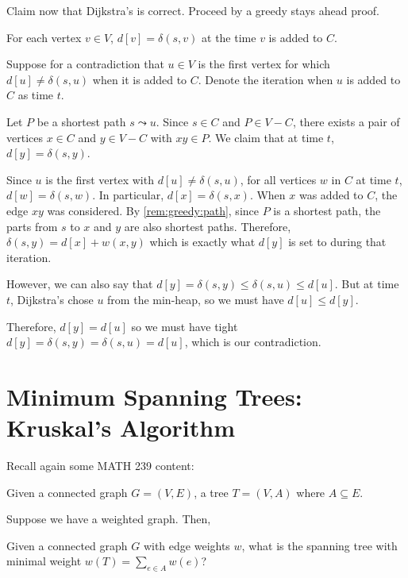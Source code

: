 Claim now that Dijkstra's is correct.
Proceed by a greedy stays ahead proof.

\begin{prop}
  For each vertex $v \in V$, $d[v] = \delta(s,v)$ at the time $v$ is added to $C$.
\end{prop}
\begin{prf}
  Suppose for a contradiction that $u \in V$
  is the first vertex for which $d[u] \neq \delta(s,u)$ when it is added to $C$.
  Denote the iteration when $u$ is added to $C$ as time $t$.

  Let $P$ be a shortest path $s \leadsto u$.
  Since $s \in C$ and $P \in V-C$,
  there exists a pair of vertices $x \in C$ and $y \in V-C$ with $xy \in P$.
  We claim that at time $t$, $d[y] = \delta(s,y)$.

  Since $u$ is the first vertex with $d[u] \neq \delta(s,u)$,
  for all vertices $w$ in $C$ at time $t$, $d[w] = \delta(s,w)$.
  In particular, $d[x] = \delta(s,x)$.
  When $x$ was added to $C$, the edge $xy$ was considered.
  By \cref{rem:greedy:path}, since $P$ is a shortest path,
  the parts from $s$ to $x$ and $y$ are also shortest paths.
  Therefore, $\delta(s,y) = d[x] + w(x,y)$ which is exactly what
  $d[y]$ is set to during that iteration.

  However, we can also say that $d[y] = \delta(s,y) \leq \delta(s,u) \leq d[u]$.
  But at time $t$, Dijkstra's chose $u$ from the min-heap,
  so we must have $d[u] \leq d[y]$.

  Therefore, $d[y] = d[u]$ so we must have tight $d[y] = \delta(s,y) = \delta(s,u) = d[u]$,
  which is our contradiction.
\end{prf}

\section{Minimum Spanning Trees: Kruskal's Algorithm}

Recall again some MATH 239 content:

\begin{defn}
  Given a connected graph $G = (V,E)$,
  a tree $T = (V,A)$ where $A \subseteq E$.
\end{defn}

Suppose we have a weighted graph. Then,

\begin{problem}
  Given a connected graph $G$ with edge weights $w$,
  what is the spanning tree with minimal weight $w(T) = \sum_{e \in A}w(e)$?
\end{problem}

